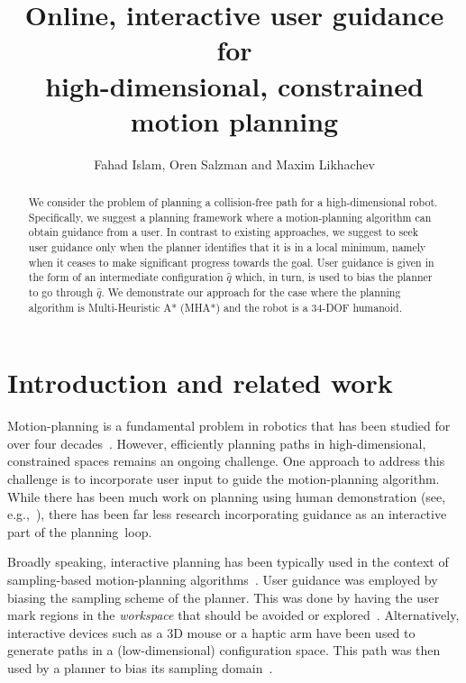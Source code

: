 \documentclass[conference]{IEEEtran}
\begin{document}
\title{	Online, interactive user guidance for \\
		high-dimensional, constrained motion planning }

\author{Fahad Islam, Oren Salzman and Maxim Likhachev}


\maketitle
\thispagestyle{empty}
\pagestyle{empty}



\begin{abstract}
We consider the problem of planning a collision-free path for a high-dimensional robot.
Specifically, we suggest a planning framework where a motion-planning algorithm can obtain guidance from a user.
In contrast to existing approaches, we suggest to seek user guidance only when the planner identifies that it is in a local minimum, namely when it ceases to make significant progress towards the goal.
User guidance is given in the form of an intermediate configuration $\hat{q}$ which, in turn, is used to bias the planner to go through $\hat{q}$.
We demonstrate our approach for the case where the planning algorithm is Multi-Heuristic A* (MHA*) and the robot is a 34-DOF humanoid.
\end{abstract}

\IEEEpeerreviewmaketitle

\section{Introduction and related work}
\label{sec:intro}

Motion-planning is a fundamental problem in robotics that has been studied for over four decades~\cite{CBHKKLT05,L06,S04}.
However, efficiently planning paths in high-dimensional, constrained spaces remains an ongoing challenge.
One approach to address this challenge is to incorporate user input to guide the motion-planning algorithm.
While there has been much work on planning using human demonstration 
(see, e.g.,~\cite{ACVB09, HS16, PHCL16, SHLA16, YA17}), 
there has been far less research incorporating guidance as an interactive part of the planning~loop.

Broadly speaking, interactive planning has been typically used in the context of sampling-based motion-planning algorithms~\cite{L06}.
User guidance was employed by biasing the sampling scheme of the planner.
This was done by having the user mark regions in the \emph{workspace} that should be avoided or 
explored~\cite{DSJA14, MTMKDC15, YPB15}.
Alternatively, interactive devices such as a 3D mouse or a haptic arm have been used to generate paths in a (low-dimensional) configuration space. This path was then used by a planner to bias its 
sampling domain~\cite{BTFF16, FTF09, TFF12}.
\end{document}
